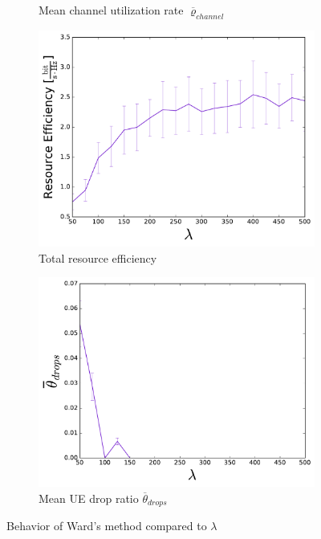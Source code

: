 \begin{figure}
\begin{subfigure}[b]{0.5\linewidth}
    \caption{Mean channel utilization rate $\overline{\varrho}_{channel}$} 
    \label{fig:WARD_8} 
    \vspace{4ex}
  \end{subfigure} 
  \begin{subfigure}[b]{0.5\linewidth}
    \centering
    \captionsetup{justification=centering}
    \includegraphics[width=1\linewidth]{figures/WARD_9} 
    \caption{Total resource efficiency} 
    \label{fig:WARD_9} 
  \end{subfigure}%
  \begin{subfigure}[b]{0.5\linewidth}
    \centering
    \captionsetup{justification=centering}
    \includegraphics[width=1\linewidth]{figures/WARD_10} 
    \caption{Mean UE drop ratio $\overline{\theta}_{drops}$} 
    \label{fig:WARD_10} 
  \end{subfigure} 
  \caption{Behavior of Ward's method compared to $\lambda$}
  \label{fig:pretty_results_WARD} 
\end{figure}

